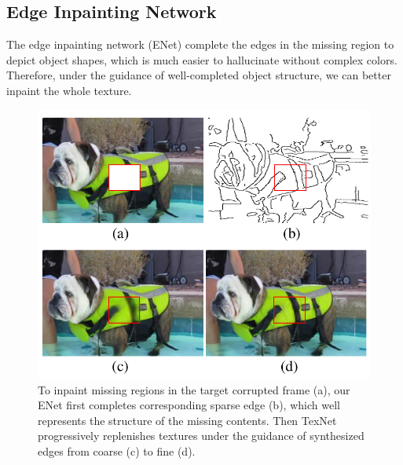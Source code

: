 \subsection{Edge Inpainting Network}
\label{sec:edgenet}
The edge inpainting network (ENet) complete the edges in the missing region to depict object shapes, which is much easier to hallucinate without complex colors.
Therefore, under the guidance of well-completed object structure, we can better inpaint the whole texture.
\begin{figure}[t]
	\centering
	\includegraphics[width=0.8\columnwidth]{coars-fine} %
	\caption{To inpaint missing regions in the target corrupted frame (a), our ENet first completes corresponding sparse edge (b), which well represents the structure of the missing contents. Then TexNet progressively replenishes textures under the guidance of synthesized edges from coarse (c) to fine (d).}
	
	\label{fig:coarse-fine}
\end{figure}
 


